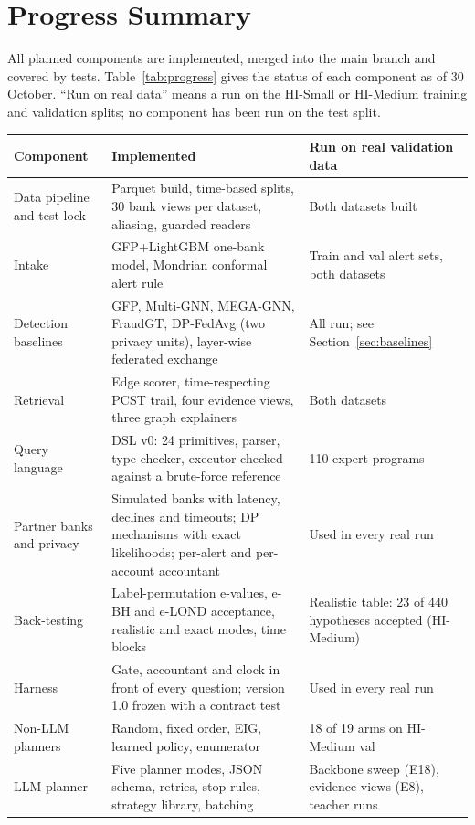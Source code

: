 \documentclass[11pt,a4paper]{article}
\begin{document}
\section{Progress Summary}

All planned components are implemented, merged into the main branch and covered by tests. Table~\ref{tab:progress} gives the status of each component as of 30 October. ``Run on real data'' means a run on the HI-Small or HI-Medium training and validation splits; no component has been run on the test split.

\begin{table}[!htbp]
\centering\small
\begin{tabularx}{\textwidth}{@{}p{3.6cm}LL@{}}
\toprule
Component & Implemented & Run on real validation data \\
\midrule
Data pipeline and test lock & Parquet build, time-based splits, 30 bank views per dataset, aliasing, guarded readers & Both datasets built \\
Intake & GFP+LightGBM one-bank model, Mondrian conformal alert rule & Train and val alert sets, both datasets \\
Detection baselines & GFP, Multi-GNN, MEGA-GNN, FraudGT, DP-FedAvg (two privacy units), layer-wise federated exchange & All run; see Section~\ref{sec:baselines} \\
Retrieval & Edge scorer, time-respecting PCST trail, four evidence views, three graph explainers & Both datasets \\
Query language & DSL v0: 24 primitives, parser, type checker, executor checked against a brute-force reference & 110 expert programs \\
Partner banks and privacy & Simulated banks with latency, declines and timeouts; DP mechanisms with exact likelihoods; per-alert and per-account accountant & Used in every real run \\
Back-testing & Label-permutation e-values, e-BH and e-LOND acceptance, realistic and exact modes, time blocks & Realistic table: 23 of 440 hypotheses accepted (HI-Medium) \\
Harness & Gate, accountant and clock in front of every question; version 1.0 frozen with a contract test & Used in every real run \\
Non-LLM planners & Random, fixed order, EIG, learned policy, enumerator & 18 of 19 arms on HI-Medium val \\
LLM planner & Five planner modes, JSON schema, retries, stop rules, strategy library, batching & Backbone sweep (E18), evidence views (E8), teacher runs \\

\end{tabularx}
\end{table}
\end{document}
